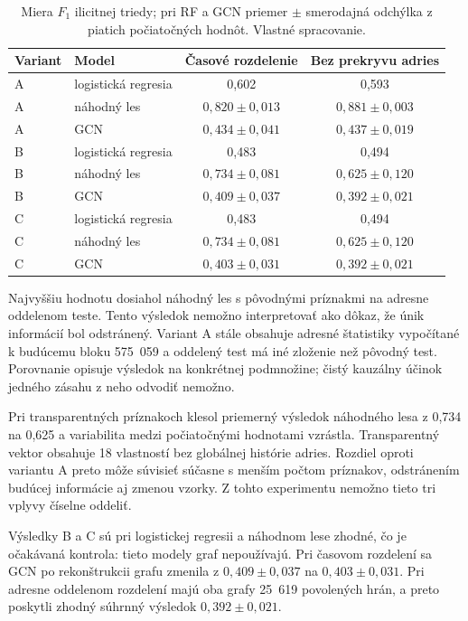 \begin{table}[htbp]
  \centering
  \caption{Miera $F_1$ ilicitnej triedy; pri RF a GCN priemer
  $\pm$ smerodajná odchýlka z piatich počiatočných hodnôt. Vlastné spracovanie.}
  \label{tab:model-results}
  \begin{tabular}{llcc}
    \toprule
    Variant & Model & Časové rozdelenie & Bez prekryvu adries \\
    \midrule
    A & logistická regresia & 0,602 & 0,593 \\
    A & náhodný les & $0,820\pm0,013$ & $0,881\pm0,003$ \\
    A & GCN & $0,434\pm0,041$ & $0,437\pm0,019$ \\
    \midrule
    B & logistická regresia & 0,483 & 0,494 \\
    B & náhodný les & $0,734\pm0,081$ & $0,625\pm0,120$ \\
    B & GCN & $0,409\pm0,037$ & $0,392\pm0,021$ \\
    \midrule
    C & logistická regresia & 0,483 & 0,494 \\
    C & náhodný les & $0,734\pm0,081$ & $0,625\pm0,120$ \\
    C & GCN & $0,403\pm0,031$ & $0,392\pm0,021$ \\
    \bottomrule
  \end{tabular}
\end{table}

Najvyššiu hodnotu dosiahol náhodný les s pôvodnými príznakmi na
adresne oddelenom teste. Tento výsledok nemožno interpretovať ako
dôkaz, že únik informácií bol odstránený. Variant A stále obsahuje
adresné štatistiky vypočítané k budúcemu bloku 575~059 a oddelený test
má iné zloženie než pôvodný test. Porovnanie opisuje výsledok na
konkrétnej podmnožine; čistý kauzálny účinok jedného zásahu z neho
odvodiť nemožno.

Pri transparentných príznakoch klesol priemerný výsledok náhodného lesa
z 0,734 na 0,625 a variabilita medzi počiatočnými hodnotami vzrástla. Transparentný
vektor obsahuje 18 vlastností bez globálnej histórie adries.
Rozdiel oproti variantu A preto môže súvisieť súčasne s menším počtom
príznakov, odstránením budúcej informácie aj zmenou vzorky. Z tohto
experimentu nemožno tieto tri vplyvy číselne oddeliť.

Výsledky B a C sú pri logistickej regresii a náhodnom lese zhodné, čo
je očakávaná kontrola: tieto modely graf nepoužívajú. Pri časovom
rozdelení sa GCN po rekonštrukcii grafu zmenila z
$0,409\pm0,037$ na $0,403\pm0,031$. Pri adresne oddelenom rozdelení
majú oba grafy 25~619 povolených hrán, a preto poskytli zhodný súhrnný
výsledok $0,392\pm0,021$.

